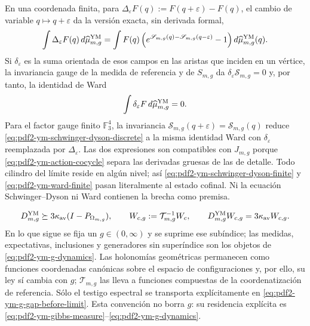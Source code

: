 En una coordenada finita, para
$\Delta_\varepsilon F(q):=F(q+\varepsilon)-F(q)$, el cambio de variable
$q\mapsto q+\varepsilon$ da la versión exacta, sin derivada formal,
\begin{equation}\label{eq:pdf2-ym-schwinger-dyson-discrete}
 \int\Delta_\varepsilon F(q)\,d\widehat\mu_{m,g}^{\rm YM}
 =\int F(q)
  \left(e^{\mathscr S_{m,g}(q)-\mathscr S_{m,g}(q-\varepsilon)}-1\right)
  d\widehat\mu_{m,g}^{\rm YM}(q).
\end{equation}
Si $\delta_\varepsilon$ es la suma orientada de esos campos en las aristas que
inciden en un vértice, la invariancia gauge de la medida de referencia y de
$S_{m,g}$ da $\delta_\varepsilon\mathscr S_{m,g}=0$ y, por tanto, la identidad de Ward
\begin{equation}\label{eq:pdf2-ym-ward-finite}
 \int\delta_\varepsilon F\,d\widehat\mu_{m,g}^{\rm YM}=0.
\end{equation}
Para el factor gauge finito $\mathbb F_3^4$, la invariancia
$\mathscr S_{m,g}(q+\varepsilon)=\mathscr S_{m,g}(q)$ reduce
\eqref{eq:pdf2-ym-schwinger-dyson-discrete} a la misma identidad Ward con
$\delta_\varepsilon$ reemplazada por $\Delta_\varepsilon$.
Las dos expresiones son compatibles con $\widehat J_{m,g}$ porque
\eqref{eq:pdf2-ym-action-cocycle} separa las derivadas gruesas de las de detalle.
Todo cilindro del límite reside en algún nivel; así
\eqref{eq:pdf2-ym-schwinger-dyson-finite} y
\eqref{eq:pdf2-ym-ward-finite} pasan literalmente al estado cofinal. Ni la
ecuación Schwinger--Dyson ni Ward contienen la brecha como premisa.

\begin{equation}\label{eq:pdf2-ym-g-gap-before-limit}
 D_{m,g}^{\rm YM}\succeq3\kappa_{\rm av}
 (I-P_{\Omega_{m,g}}),
 \qquad
 W_{c,g}:=\mathcal T_{m,g}^{-1}W_c,
 \qquad
 D_{m,g}^{\rm YM}W_{c,g}=3\kappa_{\rm av}W_{c,g}.
\end{equation}
En lo que sigue se fija un $g\in(0,\infty)$ y se suprime ese subíndice; las
medidas, expectativas, inclusiones y generadores sin superíndice son los objetos
de \eqref{eq:pdf2-ym-g-dynamics}. Las holonomías geométricas permanecen como
funciones coordenadas canónicas sobre el espacio de configuraciones y, por ello, su
ley sí cambia con $g$; $\mathcal T_{m,g}$ las lleva a funciones compuestas de la
coordenatización de referencia. Sólo el testigo espectral se transporta explícitamente en
\eqref{eq:pdf2-ym-g-gap-before-limit}. Esta convención no borra $g$: su residencia explícita es
\eqref{eq:pdf2-ym-gibbs-measure}--\eqref{eq:pdf2-ym-g-dynamics}.

